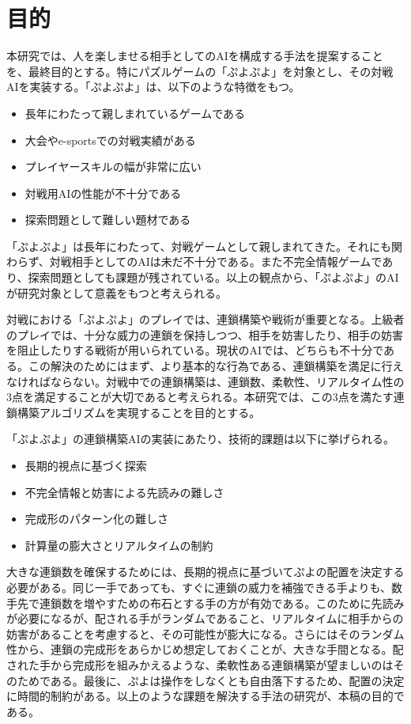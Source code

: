\documentclass[12pt]{jarticle}
\begin{document}
\section{目的}
本研究では、人を楽しませる相手としてのAIを構成する手法を提案することを、最終目的とする。特にパズルゲームの「ぷよぷよ」を対象とし、その対戦AIを実装する。「ぷよぷよ」は、以下のような特徴をもつ。
\begin{itemize}
\item 長年にわたって親しまれているゲームである
\item 大会やe-sportsでの対戦実績がある
\item プレイヤースキルの幅が非常に広い
\item 対戦用AIの性能が不十分である
\item 探索問題として難しい題材である
\end{itemize}
「ぷよぷよ」は長年にわたって、対戦ゲームとして親しまれてきた。それにも関わらず、対戦相手としてのAIは未だ不十分である。また不完全情報ゲームであり、探索問題としても課題が残されている。以上の観点から、「ぷよぷよ」のAIが研究対象として意義をもつと考えられる。

対戦における「ぷよぷよ」のプレイでは、連鎖構築や戦術が重要となる。上級者のプレイでは、十分な威力の連鎖を保持しつつ、相手を妨害したり、相手の妨害を阻止したりする戦術が用いられている。現状のAIでは、どちらも不十分である。この解決のためにはまず、より基本的な行為である、連鎖構築を満足に行えなければならない。対戦中での連鎖構築は、連鎖数、柔軟性、リアルタイム性の3点を満足することが大切であると考えられる。本研究では、この3点を満たす連鎖構築アルゴリズムを実現することを目的とする。

「ぷよぷよ」の連鎖構築AIの実装にあたり、技術的課題は以下に挙げられる。
\begin{itemize}
\item 長期的視点に基づく探索
\item 不完全情報と妨害による先読みの難しさ
\item 完成形のパターン化の難しさ
\item 計算量の膨大さとリアルタイムの制約
\end{itemize}
大きな連鎖数を確保するためには、長期的視点に基づいてぷよの配置を決定する必要がある。同じ一手であっても、すぐに連鎖の威力を補強できる手よりも、数手先で連鎖数を増やすための布石とする手の方が有効である。このために先読みが必要になるが、配される手がランダムであること、リアルタイムに相手からの妨害があることを考慮すると、その可能性が膨大になる。さらにはそのランダム性から、連鎖の完成形をあらかじめ想定しておくことが、大きな手間となる。配された手から完成形を組みかえるような、柔軟性ある連鎖構築が望ましいのはそのためである。最後に、ぷよは操作をしなくとも自由落下するため、配置の決定に時間的制約がある。以上のような課題を解決する手法の研究が、本稿の目的である。
\end{document}
